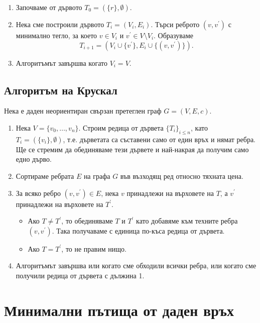 \begin{enumerate}
\item 
  Започваме от дървото $T_0 = (\{r\},\emptyset)$.
\item
  Нека сме построили дървото $T_i = (V_i,E_i)$.
  Търси реброто $(v,v^\prime)$ с минимално тегло, за което
  $v \in V_i$ и $v^\prime \in V \setminus V_i$.
  Образуваме \[T_{i+1} = (V_i\cup\{v^\prime\}, E_i \cup \{(v,v^\prime)\}).\]
\item
  Алгоритъмът завършва когато $V_i = V$.
\end{enumerate}

\subsection{Алгоритъм на Крускал}

Нека е даден неориентиран свързан претеглен граф $G = (V,E,c)$.
\begin{enumerate}
\item
  Нека $V = \{v_0,\dots,v_n\}$.
  Строим редица от дървета $\{T_i\}_{i \leq n}$, като
  $T_i = (\{v_i\},\emptyset)$, т.е. дърветата са съставени само от един връх и нямат ребра.
  Ще се стремим да обединяваме тези дървете и най-накрая да получим само едно дърво.
\item
  Сортираме ребрата $E$ на графа $G$ във възходящ ред относно тяхната цена.
\item
  За всяко ребро $(v,v^\prime) \in E$, нека $v$ принадлежи на върховете на $T$, а $v^\prime$ 
  принадлежи на върховете на $T^\prime$.
  \begin{itemize}
  \item 
    Ако $T \neq T^\prime$, то обединяваме $T$ и $T^\prime$ като добавяме към техните ребра $(v,v^\prime)$.
    Така получаваме с единица по-къса редица от дървета.
  \item
    Ако $T = T^\prime$, то не правим нищо.    
  \end{itemize}  
\item
  Алгоритъмът завършва или когато сме обходили всички ребра, или
  когато сме получили редица от дървета с дължина 1.
\end{enumerate}

\section{Минимални пътища от даден връх}

